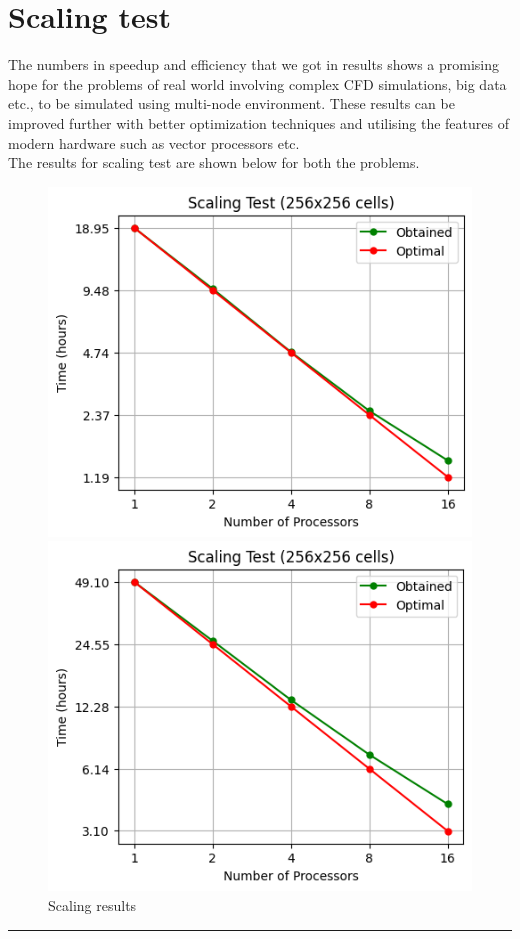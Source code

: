\section{Scaling test} \label{st}
The numbers in speedup and efficiency that we got in results shows a promising hope for the problems of real world involving complex CFD simulations, big data etc., to be simulated using multi-node environment. These results can be improved further with better optimization techniques and utilising the features of modern hardware such as vector processors etc.\\ 
The results for scaling test are shown below for both the problems.\\
\begin{figure}[!ht]
    \centering
    \begin{minipage}{0.5\textwidth}
        \centering
        \includegraphics[width=0.95\linewidth]{attachments/scaling_vortex.png}
    \end{minipage}%
    \begin{minipage}{0.5\textwidth}
        \centering
        \includegraphics[width=0.95\linewidth]{attachments/scaling_kelvin2.png}
    \end{minipage}
    \caption{Scaling results}
\end{figure}

\begin{center}
    \rule{3cm}{1pt}
\end{center}